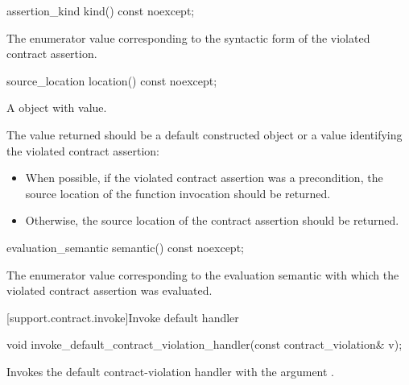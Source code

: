 \begin{itemdecl}
assertion_kind kind() const noexcept;
\end{itemdecl}

\begin{itemdescr}
\pnum
\returns
The enumerator value
corresponding to
the syntactic form of the violated contract assertion.

\end{itemdescr}

\begin{itemdecl}
source_location location() const noexcept;
\end{itemdecl}

\begin{itemdescr}
\pnum
\returns
A  object
with
value.

\pnum
\recommended
The value returned should be
a default constructed  object
or a value identifying the violated contract assertion:
\begin{itemize}
\item
When possible,
if the violated contract assertion was a precondition,
the source location of the function invocation should be returned.
\item
Otherwise,
the source location of the contract assertion should be returned.
\end{itemize}

\end{itemdescr}

\begin{itemdecl}
evaluation_semantic semantic() const noexcept;
\end{itemdecl}

\begin{itemdescr}

\pnum
\returns
The enumerator value
corresponding to
the evaluation semantic with which
the violated contract assertion was evaluated.

\end{itemdescr}

[support.contract.invoke]{Invoke default handler}

\begin{itemdecl}
void invoke_default_contract_violation_handler(const contract_violation& v);
\end{itemdecl}

\begin{itemdescr}
\pnum
\effects
Invokes the default contract-violation handler
with the argument .

\end{itemdescr}

